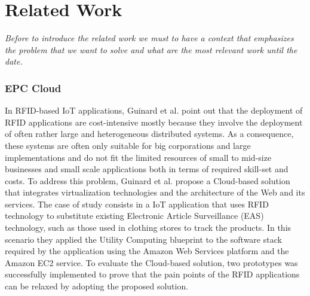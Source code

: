 \section{Related Work}
\label{sec:related_work}
\textit{Before to introduce the related work we must to have a context that emphasizes the
problem that we want to solve and what are the most relevant work until the date.}
\subsubsection{EPC Cloud}
\label{subs:epc-cloud}
In RFID-based IoT applications, Guinard et al. \cite{guinard2011cloud} point out that the
deployment of RFID applications are cost-intensive mostly because they involve the
deployment of often rather large and heterogeneous distributed systems. As a consequence,
these systems are often only suitable for big corporations and large implementations and
do not fit the limited resources of small to mid-size businesses and small scale applications
both in terms of required skill-set and costs. To address this problem, Guinard et al. propose
a Cloud-based solution that integrates virtualization technologies and the architecture of
the Web and its services. The case of study consists in a IoT application that uses RFID technology
to substitute existing Electronic Article Surveillance (EAS) technology, such as those used in
clothing stores to track the products. In this scenario they applied the Utility Computing blueprint
to the software stack required by the application using the Amazon Web Services platform and the
Amazon EC2 service. To evaluate the Cloud-based solution, two prototypes was successfully
implemented to prove that the pain points of the RFID applications can be relaxed by adopting the
proposed solution.

